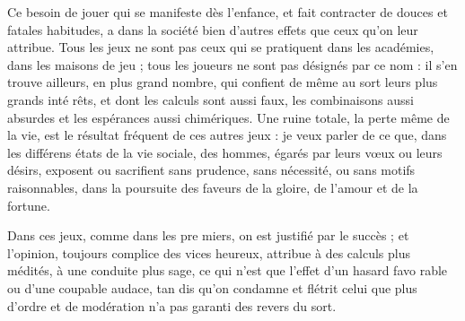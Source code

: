 Ce besoin de jouer qui se manifeste
dès l'enfance, et fait contracter de
douces et fatales habitudes, a dans
la société bien d'autres effets que ceux
qu'on leur attribue. Tous les jeux ne
sont pas ceux qui se pratiquent dans
les académies, dans les maisons de jeu ;
tous les joueurs ne sont pas désignés
par ce nom : il s'en trouve ailleurs, en
plus grand nombre, qui confient de
même au sort leurs plus grands inté%
rêts, et dont les calculs sont aussi faux,
les combinaisons aussi absurdes et les
espérances aussi chimériques. Une
ruine totale, la perte même de la vie,
est le résultat fréquent de ces autres
jeux : je veux parler de ce que, dans
les différens états de la vie sociale,
des hommes, égarés par leurs vœux
ou leurs désirs, exposent ou sacrifient
sans prudence, sans nécessité, ou sans
motifs raisonnables, dans la poursuite
des faveurs de la gloire, de l'amour
et de la fortune.

Dans ces jeux, comme dans les pre%
miers, on est justifié par le succès ; et
l'opinion, toujours complice des vices
heureux, attribue à des calculs plus
médités, à une conduite plus sage, ce
qui n'est que l'effet d'un hasard favo%
rable ou d'une coupable audace, tan%
dis qu'on condamne et flétrit celui que
plus d'ordre et de modération n'a pas
garanti des revers du sort.


